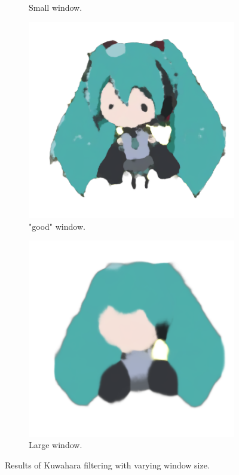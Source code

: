 \documentclass{beamer}
\begin{document}
\begin{frame}
\begin{figure}[htb!]
\begin{subfigure}{.24\textwidth}
\caption{Small window.}
\end{subfigure}
\begin{subfigure}{.24\textwidth}
\includegraphics[width=\textwidth]{../images/miku_d_filtered.png}
\caption{"good" window.}
\end{subfigure}
\begin{subfigure}{.24\textwidth}
\includegraphics[width=\textwidth]{../images/miku_d_filtered_largeh.png}
\caption{Large window.}
\end{subfigure}
\caption{Results of Kuwahara filtering with varying window size.}
\label{fig:kuwaharaExample}
\end{figure}

\end{frame}
\end{document}
